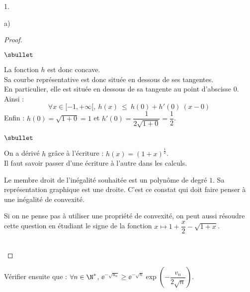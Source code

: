 \documentclass[11pt]{article}%
\begin{document}
\begin{noliste}{1.}
\begin{noliste}{a)}
\begin{proof}
\begin{noliste}{$\sbullet$}
      \item La fonction $h$ est donc concave.\\
        Sa courbe représentative est donc située en dessous de ses
        tangentes.\\
        En particulier, elle est située en dessous de sa tangente au
        point d'abscisse $0$. Ainsi :
        \[
        \forall x \in [-1,+\infty[, \ h(x) \ \leq \ h(0) + h'(0) \ (x-0)
        \]
        Enfin : $h(0) =\sqrt{1+0} = 1$ \quad et \quad $h'(0) =
        \dfrac{1}{2\sqrt{1+0}} = \dfrac{1}{2}$.%
        \conc{$\forall x\in[-1,+\infty[$, $\sqrt{1+x} \leq
          1 + \dfrac{x}{2}$}~\\[-1cm]
      \end{noliste}
      \begin{remark}%
        \begin{noliste}{$\sbullet$}
        \item On a dérivé $h$ grâce à l'écriture : $h(x) =
          (1+x)^{\frac{1}{2}}$.\\
          Il faut savoir passer d'une écriture à l'autre dans les
          calculs.
        \item Le membre droit de l'inégalité souhaitée est un polynôme
          de degré $1$. Sa représentation graphique est une droite.
          C'est ce constat qui doit faire penser à une inégalité de
          convexité.
        \item Si on ne pense pas à utiliser une propriété de
          convexité, on peut aussi résoudre cette question en étudiant
          le signe de la fonction $x \mapsto 1 + \dfrac{x}{2} -
          \sqrt{1+x}$.
        \end{noliste}
      \end{remark}~\\[-1.5cm]
    \end{proof}


    \newpage


  \item Vérifier ensuite que : $\forall n \in \N^{*}$,
    $\ee^{-\sqrt{u_n}} \geq \ee^{-\sqrt{n}} \exp\left(
      -\dfrac{v_n}{2\sqrt{n}} \right)$.


\end{noliste}
\end{noliste}
\end{document}
